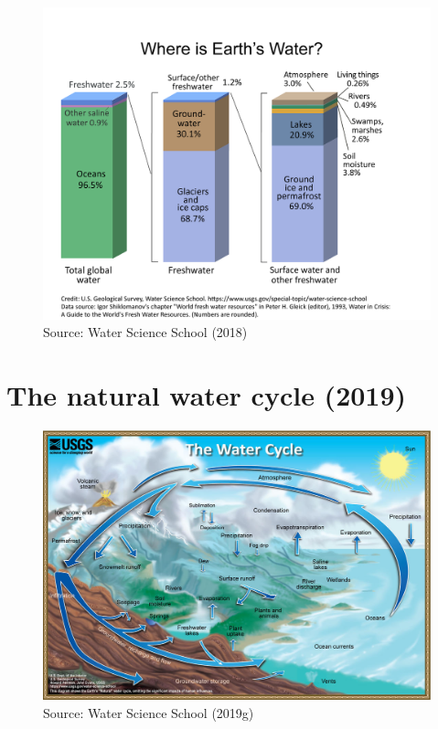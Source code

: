 \documentclass[
  letterpaper,
  DIV=11,
  numbers=noendperiod]{scrreprt}
\begin{document}
\begin{figure}

{\centering \includegraphics{archive/figures/EarthsWater-BarChart.png}

}

\caption{Source: Water Science School (2018)}

\end{figure}

\hypertarget{the-natural-water-cycle-2019}{%
\section{The natural water cycle
(2019)}\label{the-natural-water-cycle-2019}}

\begin{figure}

{\centering \includegraphics{archive/figures/water-cycle.jpg}

}

\caption{Source: Water Science School (2019g)}

\end{figure}
\end{document}
